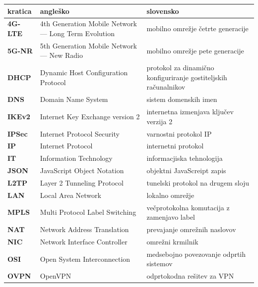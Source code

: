 \documentclass[a4paper, 12pt]{book}
\begin{document}
\noindent\begin{tabular}{p{}|p{}|p{}}    %

  {\bf kratica} & {\bf angleško}                             & {\bf slovensko} \\ \hline\hline
  
  {\bf 4G-LTE} & 4th Generation Mobile Network --- Long Term Evolution & mobilno omrežje četrte generacije\\ \hline
  {\bf 5G-NR}   & 5th Generation Mobile Network --- New Radio    &  mobilno omrežje pete generacije \\ \hline
  {\bf DHCP}   & Dynamic Host Configuration Protocol    &  protokol za dinamično konfiguriranje gostiteljskih računalnikov \\ \hline
  {\bf DNS}   & Domain Name System    &  sistem domenskih imen \\ \hline
  {\bf IKEv2}   & Internet Key Exchange version 2         &  internetna izmenjava ključev verzija 2 \\ \hline  
  {\bf IPSec}   & Internet Protocol Security              &  varnostni protokol IP \\ \hline
  {\bf IP}   & Internet Protocol           & internetni protokol\\ \hline
  {\bf IT}   & Information Technology    &  informacjiska tehnologija \\ \hline
  {\bf JSON}   & JavaScript Object Notation   &   objektni JavaScreipt zapis\\  \hline
  {\bf L2TP}   & Layer 2 Tunneling Protocol   &  tunelski protokol na drugem sloju   \\ \hline
  {\bf LAN} & Local Area Network & lokalno omrežje \\ \hline
  {\bf MPLS}   & Multi Protocol Label Switching    &  večprotokolna komutacija z zamenjavo label    \\ \hline
  {\bf NAT}   & Network Address Translation    & prevajanje omrežnih naslovov \\ \hline
  {\bf NIC}   & Network Interface Controller  & omrežni krmilnik \\ \hline
  {\bf OSI}   & Open System Interconnection    &  medsebojno povezovanje odprtih sistemov  \\ \hline
  {\bf OVPN}   & OpenVPN    &  odprtokodna rešitev za VPN\\
  
  
 \end{tabular} 
 
\end{document}
